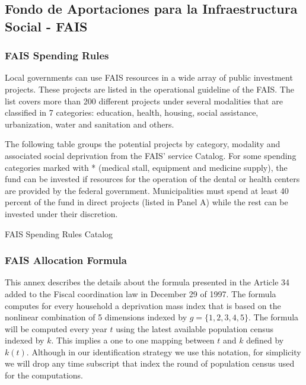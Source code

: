 \documentclass[dv_diss_main.tex]{subfiles}
\begin{document}

\normalsize
\normalfont



\subsection{Fondo de Aportaciones para la Infraestructura Social - FAIS}

\subsubsection{FAIS Spending Rules}\label{ap:faisspending}

Local governments can use FAIS resources in a wide array of public investment projects. These projects are listed in the operational guideline of the FAIS. The list covers more than 200 different projects under several modalities that are classified in 7 categories: education, health, housing, social assistance, urbanization, water and sanitation and others. 

The following table groups the potential projects by category, modality and associated social deprivation from the FAIS' service Catalog. For some spending categories marked with * (medical stall, equipment and medicine supply), the fund can be invested  if resources for the operation of the dental or health centers are provided by the federal government. Municipalities must spend at least 40 percent of the fund in direct projects (listed in Panel A) while the rest can be invested under their discretion.


\begin{table}[H]
	\centering
	\small
	\caption{FAIS Spending Rules Catalog}\label{fig:discon}
	\label{trends_inf}
	\resizebox{\textwidth}{!}{
		
				}		
\parbox{\textwidth}{\small 
\vspace{2eX}
\footnotesize	
 \spendingcatalog
  
}
\end{table}

\newpage
\subsubsection{FAIS Allocation Formula} \label{ap:faisformula}

This annex describes the details about the formula presented in the Article 34 added to the Fiscal coordination law in December 29 of 1997. The formula computes for every household a deprivation mass index that is based on the nonlinear combination of 5 dimensions indexed by $g=\{1,2,3,4,5\}$. The formula will be computed every year $t$ using the latest available population census indexed by $k$. This implies a one to one mapping between $t$ and $k$ defined by $k(t)$. Although in our identification strategy we use this notation, for simplicity we will drop any time subscript that index the round of population census used for the computations.
\end{document}

